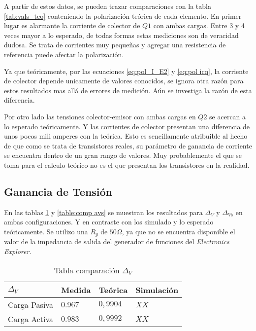 A partir de estos datos, se pueden trazar comparaciones con la tabla \ref{tab:vals_teo} conteniendo la polarización teórica de cada elemento. En primer lugar es alarmante la corriente de colector de $Q1$ con ambas cargas. Entre 3 y 4 veces mayor a lo esperado, de todas formas estas mediciones son de veracidad dudosa. Se trata de corrientes muy pequeñas y agregar una resistencia de referencia puede afectar la polarización.

Ya que teóricamente, por las ecuaciones \ref{eq:pol_I_E2} y \ref{eq:pol icq}, la corriente de colector depende unicamente de valores conocidos, se ignora otra razón para estos resultados mas allá de errores de medición. Aún se investiga la razón de esta diferencia. %

Por otro lado las tensiones colector-emisor con ambas cargas en $Q2$ se acercan a lo esperado teóricamente. Y las corrientes de colector presentan una diferencia de unos pocos mili amperes con la teórica. Esto es sencillamente atribuible al hecho de que como se trata de transistores reales, su parámetro de ganancia de corriente se encuentra dentro de un gran rango de valores. Muy probablemente el que se toma para el calculo teórico no es el que presentan los transistores en la realidad.


\subsection{Ganancia de Tensión}

En las tablas \ref{table:comp av} y \ref{table:comp avs} se muestran los resultados para $\Delta_V$ y $\Delta_{Vs}$ en ambas configuraciones. Y en contraste con los simulado y lo esperado teóricamente.
Se utilizo una $R_g$ de $50\Omega$, ya que no se encuentra disponible el valor de la impedancia de salida del generador de funciones del \textit{Electronics Explorer}.

\begin{table}[ht]
    \centering
    \begin{tabular}{|l|l|l|l|}
    \hline
    $\Delta_V $  & Medida   & Teórica  & Simulación \\ \hline
    Carga Pasiva & $0.967$  & $0,9904$ &  $XX$       \\ \hline
    Carga Activa & $0.983$  & $0,9992$ &  $XX$          \\ \hline
    \end{tabular}
    \caption{Tabla comparación $\Delta_V$}\label{table:comp av}
\end{table}

